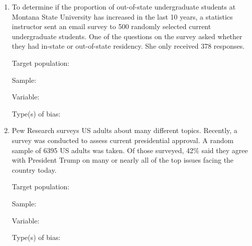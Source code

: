 \documentclass[
]{report}
\begin{document}
\begin{enumerate}
\def\labelenumi{\arabic{enumi}.}
\item
  To determine if the proportion of out-of-state undergraduate students at Montana State University has increased in the last 10 years, a statistics instructor sent an email survey to 500 randomly selected current undergraduate students. One of the questions on the survey asked whether they had in-state or out-of-state residency. She only received 378 responses.
  \vspace{0.25in}

  Target population:
  \vspace{0.3in}

  Sample:
  \vspace{0.3in}

  Variable:
  \vspace{0.3in}

  Type(s) of bias:
  \vspace{0.3in}
\item
  Pew Research surveys US adults about many different topics. Recently, a survey was conducted to assess current presidential approval. A random sample of 6395 US adults was taken. Of those surveyed, 42\% said they agree with President Trump on many or nearly all of the top issues facing the country today.
  \vspace{0.25in}

  Target population:
  \vspace{0.3in}

  Sample:
  \vspace{0.3in}

  Variable:
  \vspace{0.3in}

  Type(s) of bias:
  \vspace{0.3in}
\end{enumerate}

\newpage
\end{document}
